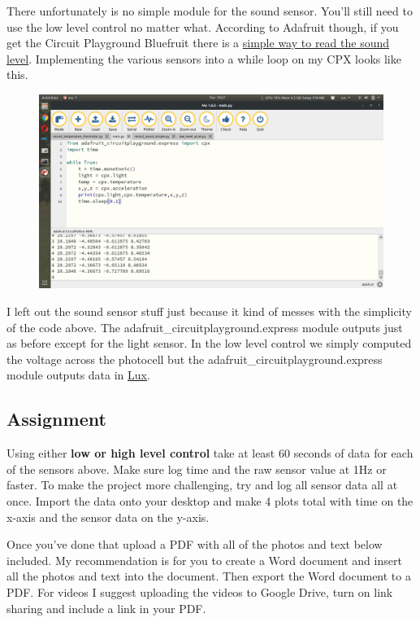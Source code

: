 {There unfortunately is no simple module for the sound sensor. You’ll still need to use the low level control no matter what. According to Adafruit though, if you get the Circuit Playground Bluefruit there is a \href{https://learn.adafruit.com/circuitpython-made-easy-on-circuit-playground-express/sound}{simple way to read the sound level}. Implementing the various sensors into a while loop on my CPX looks like this.
\begin{figure}[H]
  \begin{center}
    \includegraphics[width=\textwidth]{Figures/high_level_mu.png}
  \end{center}
\end{figure}
I left out the sound sensor stuff just because it kind of messes with the simplicity of the code above. The adafruit\_circuitplayground.express module outputs just as before except for the light sensor. In the low level control we simply computed the voltage across the photocell but the adafruit\_circuitplayground.express module outputs data in \href{https://en.wikipedia.org/wiki/Lux}{Lux}.

\subsection{Assignment}

Using either {\bf low or high level control} take at least 60 seconds of data for each of the sensors above. Make sure log time and the raw sensor value at 1Hz or faster. To make the project more challenging, try and log all sensor data all at once. Import the data onto your desktop and make 4 plots total with time on the x-axis and the sensor data on the y-axis.

Once you've done that upload a PDF with all of the photos and text below included. My recommendation is for you to create a Word document and insert all the photos and text into the document. Then export the Word document to a PDF. For videos I suggest uploading the videos to Google Drive, turn on link sharing and include a link in your PDF.

}
